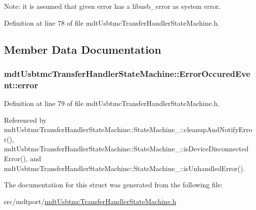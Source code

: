 Note\-: it is assumed that given error has a libusb\-\_\-error as system error. 

Definition at line 78 of file mdt\-Usbtmc\-Transfer\-Handler\-State\-Machine.\-h.



\subsection{Member Data Documentation}
\hypertarget{structmdt_usbtmc_transfer_handler_state_machine_1_1_error_occured_event_a2b80aae58a9fdddd6c4dc8c03705134c}{
\subsubsection[{error}]{ mdt\-Usbtmc\-Transfer\-Handler\-State\-Machine\-::\-Error\-Occured\-Event\-::error}}\label{structmdt_usbtmc_transfer_handler_state_machine_1_1_error_occured_event_a2b80aae58a9fdddd6c4dc8c03705134c}


Definition at line 79 of file mdt\-Usbtmc\-Transfer\-Handler\-State\-Machine.\-h.



Referenced by mdt\-Usbtmc\-Transfer\-Handler\-State\-Machine\-::\-State\-Machine\-\_\-\-::cleanup\-And\-Notify\-Error(), mdt\-Usbtmc\-Transfer\-Handler\-State\-Machine\-::\-State\-Machine\-\_\-\-::is\-Device\-Disconnected\-Error(), and mdt\-Usbtmc\-Transfer\-Handler\-State\-Machine\-::\-State\-Machine\-\_\-\-::is\-Unhandled\-Error().



The documentation for this struct was generated from the following file\-:\begin{DoxyCompactItemize}
\item 
src/mdtport/\hyperlink{mdt_usbtmc_transfer_handler_state_machine_8h}{mdt\-Usbtmc\-Transfer\-Handler\-State\-Machine.\-h}\end{DoxyCompactItemize}
